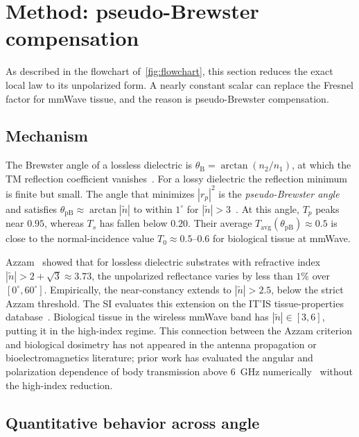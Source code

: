\documentclass[journal,twocolumn,10pt]{IEEEtran}
\newcommand{\Tavg}{T_{\mathrm{avg}}}
\newcommand{\ntilde}{\tilde{n}}
\begin{document}
\section{Method: pseudo-Brewster compensation}\label{sec:pB}

As described in the flowchart of~\cref{fig:flowchart}, this section reduces
the exact local law to its unpolarized form. A nearly constant scalar
can replace the Fresnel factor for mmWave tissue, and the reason is
pseudo-Brewster compensation.

\subsection{Mechanism}\label{subsec:pB-mech}

The Brewster angle of a lossless dielectric is $\theta_{\mathrm{B}} =
\arctan(n_2/n_1)$, at which the TM reflection coefficient
vanishes~\cite{BornWolf1999}. For a lossy dielectric the reflection
minimum is finite but small. The angle that minimizes $|r_p|^2$ is
the \textit{pseudo-Brewster angle} and satisfies
$\theta_{\mathrm{pB}} \approx \arctan|\ntilde|$ to within $1^\circ$ for
$|\ntilde| > 3$~\cite{Potter1970,Ohman1977}. At this angle, $T_p$
peaks near $0.95$, whereas $T_s$ has fallen below $0.20$. Their
average $\Tavg(\theta_{\mathrm{pB}}) \approx 0.5$ is close to the
normal-incidence value $T_0 \approx 0.5$--$0.6$ for biological
tissue at mmWave.

Azzam~\cite{Azzam2015} showed that for lossless dielectric substrates
with refractive index $|\ntilde| > 2 + \sqrt{3} \approx 3.73$, the
unpolarized reflectance varies by less than $1\%$ over $[0^\circ,
60^\circ]$. Empirically, the near-constancy extends to $|\ntilde| > 2.5$,
below the strict Azzam threshold. The SI evaluates this extension on
the IT'IS tissue-properties database~\cite{ITISv5,Gabriel1996}. Biological tissue in the wireless mmWave
band has $|\ntilde| \in [3, 6]$, putting it in the high-index
regime. This connection between the Azzam criterion and biological dosimetry
has not appeared in the antenna propagation or bioelectromagnetics literature;
prior work has evaluated the angular and polarization
dependence of body transmission above $6$~GHz
numerically~\cite{Samaras2019} without the high-index reduction.

\subsection{Quantitative behavior across angle}\label{subsec:pB-quant}
\end{document}
